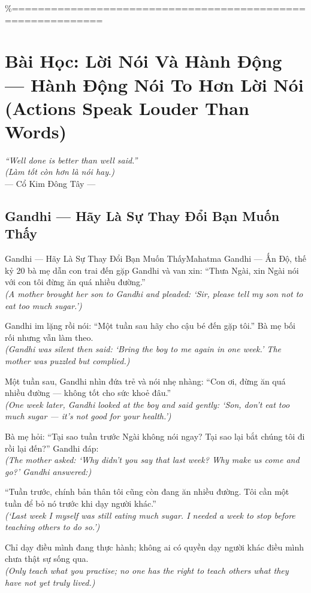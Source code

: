 \%============================================================
\chapter{Bài Học: Lời Nói Và Hành Động --- Hành Động Nói To Hơn Lời Nói (Actions Speak Louder Than Words)}
\begin{center}
  \textit{\color{truyengold}``Well done is better than well said.''}\\[4pt]
  \textit{(Làm tốt còn hơn là nói hay.)}\\[4pt]
  \small\color{truyenblue}--- Cổ Kim Đông Tây ---
\end{center}
\ngancach

\section{Gandhi --- Hãy Là Sự Thay Đổi Bạn Muốn Thấy}
\begin{truyen}{Gandhi --- Hãy Là Sự Thay Đổi Bạn Muốn Thấy}{Mahatma Gandhi --- Ấn Độ, thế kỷ 20}
 bà mẹ dẫn con trai đến gặp Gandhi và van xin: ``Thưa Ngài, xin Ngài nói với con tôi đừng ăn quá nhiều đường.''\\[4pt]
\textit{(A mother brought her son to Gandhi and pleaded: `Sir, please tell my son not to eat too much sugar.')}

Gandhi im lặng rồi nói: ``Một tuần sau hãy cho cậu bé đến gặp tôi.'' Bà mẹ bối rối nhưng vẫn làm theo.\\[4pt]
\textit{(Gandhi was silent then said: `Bring the boy to me again in one week.' The mother was puzzled but complied.)}

Một tuần sau, Gandhi nhìn đứa trẻ và nói nhẹ nhàng: ``Con ơi, đừng ăn quá nhiều đường --- không tốt cho sức khoẻ đâu.''\\[4pt]
\textit{(One week later, Gandhi looked at the boy and said gently: `Son, don't eat too much sugar --- it's not good for your health.')}

Bà mẹ hỏi: ``Tại sao tuần trước Ngài không nói ngay? Tại sao lại bắt chúng tôi đi rồi lại đến?'' Gandhi đáp:\\[4pt]
\textit{(The mother asked: `Why didn't you say that last week? Why make us come and go?' Gandhi answered:)}

``Tuần trước, chính bản thân tôi cũng còn đang ăn nhiều đường. Tôi cần một tuần để bỏ nó trước khi dạy người khác.''\\[4pt]
\textit{(`Last week I myself was still eating much sugar. I needed a week to stop before teaching others to do so.')}

\end{truyen}
\begin{baihoc}
  Chỉ dạy điều mình đang thực hành; không ai có quyền dạy người khác điều mình chưa thật sự sống qua.\\[4pt]
  \textit{(Only teach what you practise; no one has the right to teach others what they have not yet truly lived.)}
\end{baihoc}

